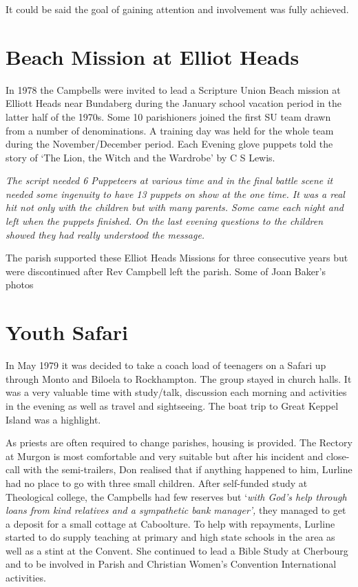It could be said the goal of gaining attention and involvement was fully achieved.

\hypertarget{beach-mission-at-elliot-heads}{%
\section{Beach Mission at Elliot Heads}\label{beach-mission-at-elliot-heads}}

In 1978 the Campbells were invited to lead a Scripture Union Beach mission at Elliott Heads near Bundaberg during the January school vacation period in the latter half of the 1970s. Some 10 parishioners joined the first SU team drawn from a number of denominations. A training day was held for the whole team during the November/December period. Each Evening glove puppets told the story of `The Lion, the Witch and the Wardrobe' by C S Lewis.

\emph{The script needed 6 Puppeteers at various time and in the final battle scene it needed some ingenuity to have 13 puppets on show at the one time. It was a real hit not only with the children but with many parents. Some came each night and left when the puppets finished. On the last evening questions to the children showed they had really understood the message.}

The parish supported these Elliot Heads Missions for three consecutive years but were discontinued after Rev Campbell left the parish. Some of Joan Baker's photos

\hypertarget{youth-safari}{%
\section{Youth Safari}\label{youth-safari}}

In May 1979 it was decided to take a coach load of teenagers on a Safari up through Monto and Biloela to Rockhampton. The group stayed in church halls. It was a very valuable time with study/talk, discussion each morning and activities in the evening as well as travel and sightseeing. The boat trip to Great Keppel Island was a highlight.

As priests are often required to change parishes, housing is provided. The Rectory at Murgon is most comfortable and very suitable but after his incident and close-call with the semi-trailers, Don realised that if anything happened to him, Lurline had no place to go with three small children. After self-funded study at Theological college, the Campbells had few reserves but `\emph{with God's help through loans from kind relatives and a sympathetic bank manager',} they managed to get a deposit for a small cottage at Caboolture. To help with repayments, Lurline started to do supply teaching at primary and high state schools in the area as well as a stint at the Convent. She continued to lead a Bible Study at Cherbourg and to be involved in Parish and Christian Women's Convention International activities.

